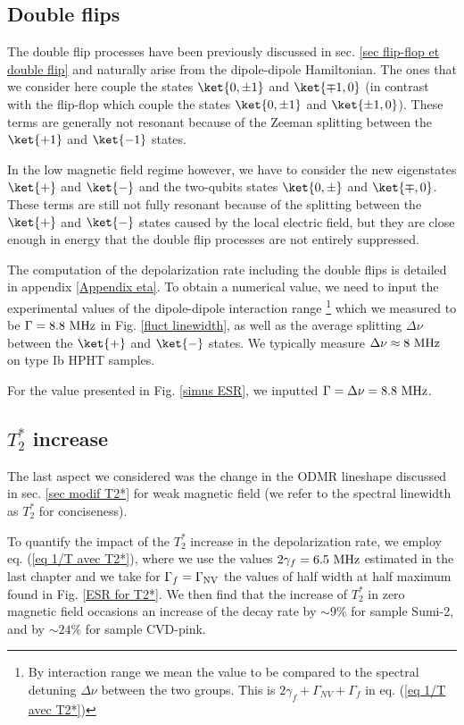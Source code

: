 \documentclass[a4paper, 11pt]{report}
\begin{document}
\subsection{Double flips}

The double flip processes have been previously discussed in sec. \ref{sec flip-flop et double flip} and naturally arise from the dipole-dipole Hamiltonian. The ones that we consider here couple the states $\ket{0, \pm 1}$ and $\ket{\mp 1, 0}$ (in contrast with the flip-flop which couple the states $\ket{0, \pm 1}$ and $\ket{\pm 1, 0}$). These terms are generally not resonant because of the Zeeman splitting between the $\ket{+1}$ and $\ket{-1}$ states. 

In the low magnetic field regime however, we have to consider the new eigenstates $\ket{+}$ and $\ket{-}$ and the two-qubits states $\ket{0, \pm}$ and $\ket{\mp, 0}$. These terms are still not fully resonant because of the splitting between the $\ket{+}$ and $\ket{-}$ states caused by the local electric field, but they are close enough in energy that the double flip processes are not entirely suppressed.

The computation of the depolarization rate including the double flips is detailed in appendix \ref{Appendix eta}. To obtain a numerical value, we need to input the experimental values of the dipole-dipole interaction range \footnote{By interaction range we mean the value to be compared to the spectral detuning $\Delta \nu$ between the two groups. This is $2\gamma_f+\Gamma_{NV}+\Gamma_f$ in eq. (\ref{eq 1/T avec T2*})} which we measured to be $\Gamma=8.8\ \rm MHz$ in Fig. \ref{fluct linewidth}, as well as the average splitting $\Delta \nu$ between the $\ket{+}$ and $\ket{-}$ states. We typically measure $\Delta \nu \approx 8\ \rm MHz$ on type Ib HPHT samples.

For the value presented in Fig. \ref{simus ESR}, we inputted $\Gamma=\Delta \nu=8.8\ \rm MHz$.


\subsection{$T_2^*$ increase}

The last aspect we considered was the change in the ODMR lineshape discussed in sec. \ref{sec modif T2*} for weak magnetic field (we refer to the spectral linewidth as $T_2^*$ for conciseness).

To quantify the impact of the $T_2^*$ increase in the depolarization rate, we employ eq. (\ref{eq 1/T avec T2*}), where we use the values $2\gamma_f = 6.5\ \rm MHz$ estimated in the last chapter and we take for $\Gamma_f=\Gamma_{\rm NV}$ the values of half width at half maximum found in Fig. \ref{ESR for T2*}. We then find that the increase of $T_2^*$ in zero magnetic field occasions an increase of the decay rate by $\sim 9 \%$ for sample Sumi-2, and by $\sim 24 \%$ for sample CVD-pink. 
\end{document}
